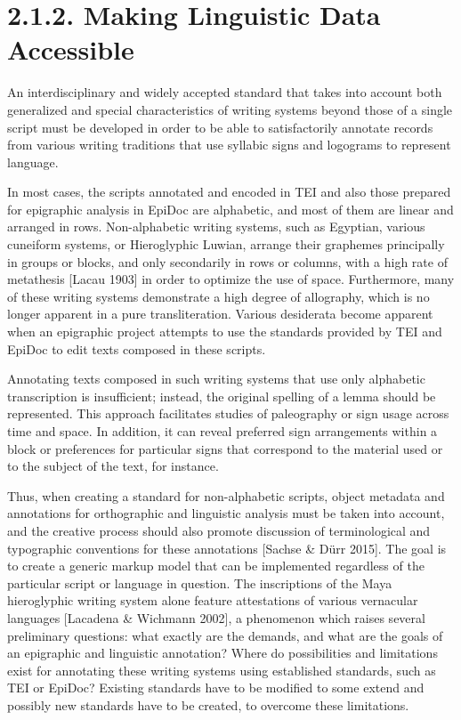 \documentclass[amsthm,ebook]{saparticle}
\begin{document}
\section[2.1.2. Making Linguistic Data Accessible]{2.1.2. Making Linguistic Data Accessible}
An interdisciplinary and widely accepted standard that takes into account both generalized and special characteristics
of writing systems beyond those of a single script must be developed in order to be able to satisfactorily annotate
records from various writing traditions that use syllabic signs and logograms to represent language.

In most cases, the scripts annotated and encoded in TEI and also those prepared for epigraphic analysis in EpiDoc are
alphabetic, and most of them are linear and arranged in rows. Non-alphabetic writing systems, such as Egyptian, various
cuneiform systems, or Hieroglyphic Luwian, arrange their graphemes principally in groups or blocks, and only
secondarily in rows or columns, with a high rate of metathesis [Lacau 1903] in order to optimize the use of space.
Furthermore, many of these writing systems demonstrate a high degree of allography, which is no longer apparent in a
pure transliteration. Various desiderata become apparent when an epigraphic project attempts to use the standards
provided by TEI and EpiDoc to edit texts composed in these scripts. 

Annotating texts composed in such writing systems that use only alphabetic transcription is insufficient; instead, the
original spelling of a lemma should be represented. This approach facilitates studies of paleography or sign usage
across time and space. In addition, it can reveal preferred sign arrangements within a block or preferences for
particular signs that correspond to the material used or to the subject of the text, for instance.

Thus, when creating a standard for non-alphabetic scripts, object metadata and annotations for orthographic and
linguistic analysis must be taken into account, and the creative process should also promote discussion of
terminological and typographic conventions for these annotations [Sachse \& Dürr 2015]. The goal is to create a generic
markup model that can be implemented regardless of the particular script or language in question. The inscriptions of
the Maya hieroglyphic writing system alone feature attestations of various vernacular languages [Lacadena \& Wichmann
2002], a phenomenon which raises several preliminary questions: what exactly are the demands, and what are the goals of
an epigraphic and linguistic annotation? Where do possibilities and limitations exist for annotating these writing
systems using established standards, such as TEI or EpiDoc? Existing standards have to be modified to some extend and
possibly new standards have to be created, to overcome these limitations. 
\end{document}
